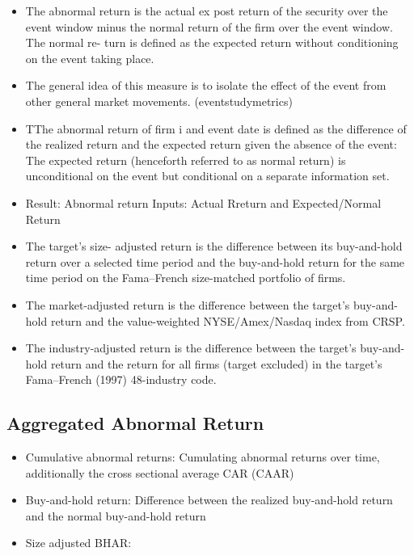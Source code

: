 \documentclass[12pt]{article}
\begin{document}
    \begin{itemize}
        \item The abnormal return is the actual ex post return of the security over the event window minus the normal return of the firm over the event window. The normal re- turn is defined as the expected return without conditioning on the event taking place. \citep{MacKinlay1997}

        \item The general idea of this measure is to isolate the effect of the event from other general market movements. (eventstudymetrics)

        \item TThe abnormal return of firm i and event date is defined as the difference of the realized return and the expected return given the absence of the event: The expected return (henceforth referred to as normal return) is unconditional on the event but conditional on a separate information set. 

        \item Result: Abnormal return Inputs: Actual Rreturn and Expected/Normal Return  
    \end{itemize}

    \begin{itemize}
        \item The target’s size- adjusted return is the difference between its buy-and-hold return over a selected time period and the buy-and-hold return for the same time period on the Fama–French size-matched portfolio of firms. 
        
        \item The market-adjusted return is the difference between the target’s buy-and-hold return and the value-weighted NYSE/Amex/Nasdaq index from CRSP. 
        
        \item The industry-adjusted return is the difference between the target’s buy-and-hold return and the return for all firms (target excluded) in the target’s Fama–French (1997) 48-industry code. \citep{Klein2009}
    \end{itemize}

\subsection{Aggregated Abnormal Return}

    \begin{itemize}
        \item Cumulative abnormal returns: Cumulating abnormal returns over time, additionally the cross sectional average CAR (CAAR)

        \item Buy-and-hold return: Difference between the realized buy-and-hold return and the normal buy-and-hold return

        \item Size adjusted BHAR: 
    \end{itemize}
\end{document}
